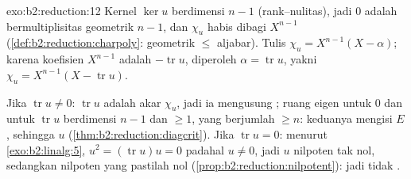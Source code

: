 \begin{solution}{exo:b2:reduction:12}
Kernel $\ker u$ berdimensi $n - 1$ (rank--nulitas), jadi $0$ adalah
 bermultiplisitas geometrik $n - 1$, dan $\chi_u$ habis
dibagi $X^{n-1}$
(\cref{def:b2:reduction:charpoly}: geometrik $\leq$ aljabar).
Tulis $\chi_u = X^{n-1}(X - \alpha)$; karena koefisien
$X^{n-1}$ adalah $-\operatorname{tr} u$, diperoleh $\alpha =
\operatorname{tr} u$, yakni $\chi_u = X^{n-1}(X - \operatorname{tr}
u)$.

Jika $\operatorname{tr} u \neq 0$: 
$\operatorname{tr} u$ adalah akar $\chi_u$, jadi ia mengusung
; ruang eigen untuk $0$ dan untuk $\operatorname{tr} u$
berdimensi $n - 1$ dan $\geq 1$, yang berjumlah $\geq n$: keduanya
mengisi $E$, sehingga $u$ 
(\cref{thm:b2:reduction:diagcrit}). Jika $\operatorname{tr} u = 0$:
menurut \cref{exo:b2:linalg:5}, $u^2 = (\operatorname{tr} u)u = 0$
padahal $u \neq 0$, jadi $u$ nilpoten tak nol, sedangkan nilpoten yang
 pastilah nol (\cref{prop:b2:reduction:nilpotent}):
jadi tidak .
\end{solution}

